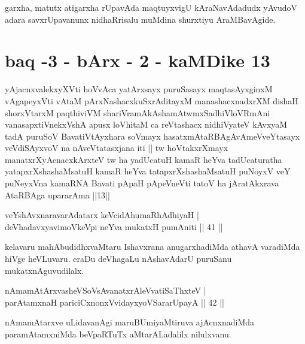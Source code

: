 \begin{artha}
garxha, matutx atigarxha rUpavAda maqtuyxvigU kAraNavAdadudx yAvudoV adara savxrUpavanunx nidhaRrisalu muMdina shurxtiyu AraMBavAgide.
\end{artha}

\section*{baq -3 - bArx - 2 - kaMDike 13}

\begin{shl}
yAjacnxvalekxyXVti hoVvAca yatArxsayx puruSasayx maqtasAyxginxM vAgapeyxVti vAtaM pArxNashacxkuSxrAditayxM manashacxnadxrXM dishaH shorxVtarxM paqthiviVM shariVramAkAshamAtwmxSadhiVloVRmAni vanasapxtiVnekxVshA apusx loVhitaM ca reVtashacx nidhiVyateV kAvxyaM tadA puruSoV BavatiVtAyxhara soVmayx hasatxmAtaRBAgAvAmeVveYtasayx veVdiSAyxvoV na nAveVtatasxjana iti || tw hoVtakxrXmayx manatxrXyAcnacxkArxteV tw ha yadUcatuH kamaR heYva tadUcaturatha yatapxrXshashaMsatuH kamaR heYva tatapxrXshashaMsatuH puNoyxV veY puNeyxVna kamaRNA Bavati pApaH pApeVneVti tatoV ha jAratAkxrava AtaRBAga upararAma ||13||
\end{shl}

\centerline{}


\begin{shl}
veYshAvxnaravarAdatarx keVcidAhumaRhAdhiyaH |\\
deVhadavxyavimoVkeV\s pi neYva mukatxH pumAniti \hfill || 41 ||
\end{shl}


\begin{artha}
kelavaru mahAbudidhxvaMtaru Ishavxrana anugarxhadiMda athavA varadiMda hiVge heVLuvaru. eraDu deVhagaLu nAshavAdarU puruSanu mukatxnAguvudilalx.
\end{artha}


\begin{shl}
nAmamAtArxvasheVSoV\s sAvanatxrAleV\s vatiSaThxteV |\\
parAtamxnaH pariciCxnonxV\s vidayxyoVSararUpayA \hfill || 42 ||
\end{shl}

\begin{artha}
nAmamAtarxve uLidavanAgi maruBUmiyaMtiruva ajAcnxnadiMda paramAtamxniMda beVpaRTuTx 
aMtarALadalilx nilulxvanu.
\end{artha}

